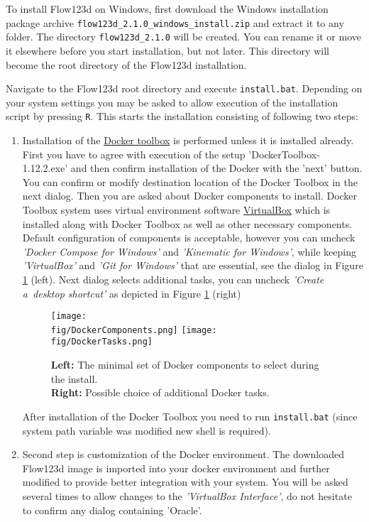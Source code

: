 \documentclass[12pt,a4paper]{report}
\def\fig{figures}
\begin{document}
To install Flow123d on Windows, first download the Windows installation package archive \verb'flow123d_2.1.0_windows_install.zip' and extract it to any folder.
The directory \verb'flow123d_2.1.0' will be created. You can rename it or move it elsewhere before you start installation, but not later. 
This directory will become the root directory of the Flow123d installation. 

Navigate to the Flow123d root directory and execute \verb'install.bat'. Depending on your system settings you may be asked to allow 
execution of the installation script by pressing \verb'R'. This starts the installation consisting of following two steps:
\begin{enumerate}
	\item Installation of the \href{https://www.docker.com/products/docker-toolbox}{Docker toolbox} is performed unless it is installed already. 
	First you have to agree with execution of the setup 'DockerToolbox-1.12.2.exe' and then
	confirm installation of the Docker with the 'next' button. You can confirm or modify destination location of the Docker Toolbox in the next dialog.
        Then you are asked about Docker components to install. Docker Toolbox system uses virtual environment software 
        \href{https://www.virtualbox.org/}{VirtualBox} which is installed along with Docker Toolbox as well as other necessary components.
        Default configuration of components is acceptable, however you can uncheck 
        \emph{'Docker Compose for Windows'} and \emph{'Kinematic for Windows'}, while keeping \emph{'VirtualBox'} and \emph{'Git for Windows'} that are essential,
        see the dialog in Figure \ref{fig:DockerComponents} (left). Next dialog selects additional tasks, you can uncheck \emph{'Create a~desktop shortcut'} as 
        depicted in Figure \ref{fig:DockerComponents} (right)
        \begin{figure}
          \center  
          \texttt{[image: \\fig/DockerComponents.png]}%
          \hspace{2ex}
          \texttt{[image: \\fig/DockerTasks.png]}
          \caption{{\bf Left:} The minimal set of Docker components to select during the install.\\
                   {\bf Right:} Possible choice of additional Docker tasks.} 
          \label{fig:DockerComponents}
        \end{figure}
	After installation of the Docker Toolbox you need to run \verb'install.bat' (since system path variable was modified new shell is required). 
	\item Second step is customization of the Docker environment. The downloaded Flow123d image is imported into your docker environment 
	and further modified to provide better integration with your system.
	You will be asked several times to allow changes to the \emph{'VirtualBox Interface'}, do not hesitate to confirm any dialog containing 'Oracle'.
		

\end{enumerate}
\end{document}
